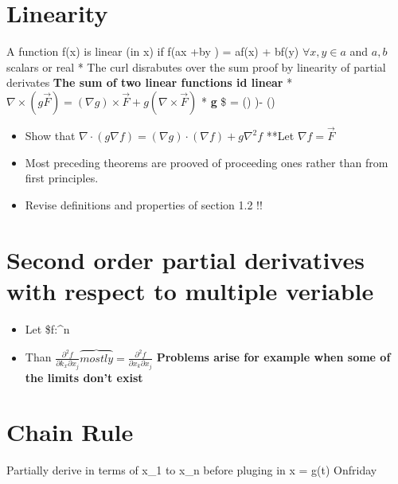 \documentclass[]{article}
\date{}
\providecommand{\tightlist}{%
  \setlength{\itemsep}{0pt}\setlength{\parskip}{0pt}}
\begin{document}
\newcommand{\R}{\mathbb{R}}

\hypertarget{linearity}{%
\section{Linearity}\label{linearity}}

A function f(x) is linear (in x) if f(ax +by ) = af(x) + bf(y)
\(\forall x,y \in a\) and \(a,b\) scalars or real * The curl disrabutes
over the sum proof by linearity of partial derivates \textbf{The sum of
two linear functions id linear} *
\(\nabla \times (g\vec{F}) = (\nabla g)\times \vec{F} + g(\nabla \times \vec{F})\)
* \textbf{g} \$  = ()\nabla \times {}
)\cdot {}- (\nabla \times {})\cdot {}

\begin{itemize}
\tightlist
\item
  Show that
  \(\nabla \cdot (g\nabla f) = (\nabla g) \cdot (\nabla f) + g\nabla ^2 f\)
  **Let \(\nabla f = \vec{F}\)
\item
  Most preceding theorems are prooved of proceeding ones rather than
  from first principles.
\item
  Revise definitions and properties of section 1.2 !!
\end{itemize}

\hypertarget{second-order-partial-derivatives-with-respect-to-multiple-veriable}{%
\section{Second order partial derivatives with respect to multiple
veriable}\label{second-order-partial-derivatives-with-respect-to-multiple-veriable}}

\begin{itemize}
\tightlist
\item
  Let \$f:\^{}n \to {}
\item
  Than
  \(\frac{\partial ^2f}{\partial k_x \partial x_j} \overbrace{mostly}{=} \frac{\partial ^2 f}{\partial x_k \partial x_j}\)
  \textbf{Problems arise for example when some of the limits don't
  exist}
\end{itemize}

\hypertarget{chain-rule}{%
\section{Chain Rule}\label{chain-rule}}

Partially derive in terms of x\_1 to x\_n before pluging in x = g(t)
Onfriday
\end{document}

